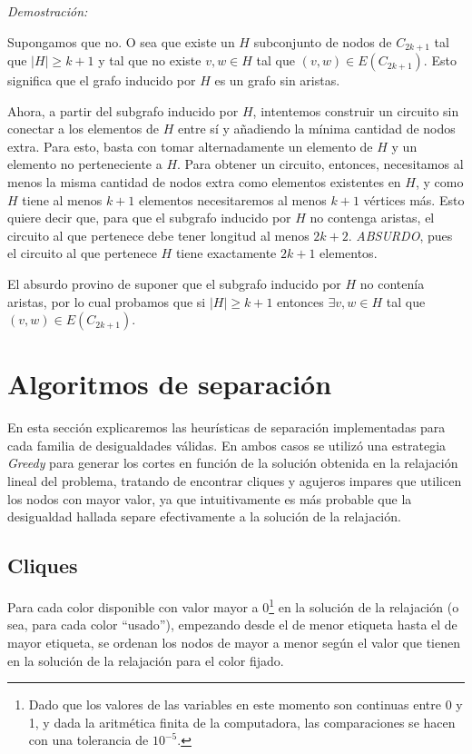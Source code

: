 \documentclass[a4paper]{article}
\begin{document}
{\it Demostración:}

Supongamos que no. O sea que existe un $H$ subconjunto de nodos de $C_{2k+1}$ tal que $|H| \geq k+1$ y tal que no existe $v,w \in H$ tal que $(v,w) \in E(C_{2k+1})$. Esto significa que el grafo inducido por $H$ es un grafo sin aristas.

Ahora, a partir del subgrafo inducido por $H$, intentemos construir un circuito sin conectar a los elementos de $H$ entre sí y añadiendo la mínima cantidad de nodos extra. Para esto, basta con tomar alternadamente un elemento de $H$ y un elemento no perteneciente a $H$.  Para obtener un circuito, entonces, necesitamos al menos la misma cantidad de nodos extra como elementos existentes en $H$, y como $H$ tiene al menos $k+1$ elementos necesitaremos al menos $k+1$ vértices más.  Esto quiere decir que, para que el subgrafo inducido por $H$ no contenga aristas, el circuito al que pertenece debe tener longitud al menos $2k+2$. {\it ABSURDO}, pues el circuito al que pertenece $H$ tiene exactamente $2k+1$ elementos.

El absurdo provino de suponer que el subgrafo inducido por $H$ no contenía aristas, por lo cual probamos que si $|H| \geq k+1$ entonces $\exists v,w \in H$ tal que $(v,w) \in E(C_{2k+1})$.

\newpage

\section{Algoritmos de separación}

En esta sección explicaremos las heurísticas de separación implementadas para cada familia de desigualdades válidas. En ambos casos se utilizó una estrategia {\it Greedy} para generar los cortes en función de la solución obtenida en la relajación lineal del problema, tratando de encontrar cliques y agujeros impares que utilicen los nodos con mayor valor, ya que intuitivamente es más probable que la desigualdad hallada separe efectivamente a la solución de la relajación.

\subsection{Cliques}

Para cada color disponible con valor mayor a 0\footnote{Dado que los valores de las variables en este momento son continuas entre 0 y 1, y dada la aritmética finita de la computadora, las comparaciones se hacen con una tolerancia de $10^{-5}$.} en la solución de la relajación (o sea, para cada color ``usado''), empezando desde el de menor etiqueta hasta el de mayor etiqueta, se ordenan los nodos de mayor a menor según el valor que tienen en la solución de la relajación para el color fijado.  
\end{document}
